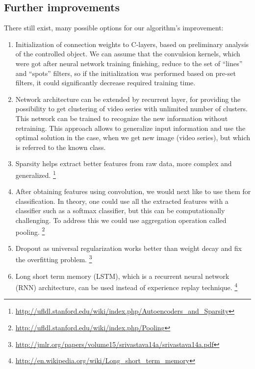 \documentclass[a4paper,oneside,dvipsnames]{article}
\begin{document}
\subsection[Further improvements]{Further improvements}
\label{subsec:improvements}

There still exist, many possible options for our algorithm’s improvement:
\begin{enumerate}
\item Initialization of connection weights to C-layers, based on preliminary analysis of the controlled object. We can assume that the convulsion kernels, which were got after neural network training finishing, reduce to the set of “lines” and “spots” filters, so if the initialization was performed based on  pre-set filters, it could significantly decrease required training time.
\item Network architecture can be extended by recurrent layer, for providing the possibility to get clustering of  video series with  unlimited number of clusters. This network can be trained to recognize the new information without retraining. This approach allows to generalize input information and use the optimal solution in the case, when we get new image (video series), but which is referred to the known class.
\item Sparsity helps extract better features from raw data, more complex and generalized.
\footnote{\url{http://ufldl.stanford.edu/wiki/index.php/Autoencoders_and_Sparsity}}
\item After obtaining features using convolution, we would next like to use them for classification. In theory, one could use all the extracted features with a classifier such as a softmax classifier, but this can be computationally challenging. To address this we could use aggregation operation called pooling.
\footnote{\url{http://ufldl.stanford.edu/wiki/index.php/Pooling}}
\item Dropout as universal regularization works better than weight decay and fix the overfitting problem.
\footnote{\url{http://jmlr.org/papers/volume15/srivastava14a/srivastava14a.pdf}}
\item Long short term memory (LSTM), which is a recurrent neural network (RNN) architecture, can be used instead of experience replay technique.
\footnote{\url{http://en.wikipedia.org/wiki/Long_short_term_memory}}
\end{enumerate}
\end{document}
